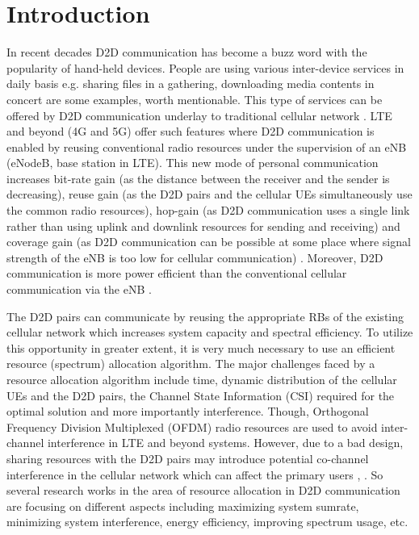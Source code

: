 \documentclass[times]{dacauth}
\begin{document}
\maketitle



\vspace{-6pt}

\section{Introduction}\label{section:Introduction}
\vspace {-0.1cm}
\noindent
In recent decades D2D communication has become a buzz word with the popularity of hand-held devices. People are using various inter-device services in daily basis e.g. sharing files in a gathering, downloading media contents in concert are some examples, worth mentionable. This type of services can be offered by D2D communication underlay to traditional cellular network \cite{doppler2009device}. LTE and beyond (4G and 5G) offer such features where D2D communication is enabled by reusing conventional radio resources under the supervision of an eNB (eNodeB, base station in LTE). This new mode of personal communication increases bit-rate gain (as the distance between the receiver and the sender is decreasing), reuse gain (as the D2D pairs and the cellular UEs simultaneously use the common radio resources), hop-gain (as D2D communication uses a single link rather than using uplink and downlink resources for sending and receiving) and coverage gain (as D2D communication can be possible at some place where signal strength of the eNB is too low for cellular communication) \cite{fodor}. Moreover, D2D communication is more power efficient than the conventional cellular communication via the eNB \cite{stefania}.
 
\smallskip
\noindent 
The D2D pairs can communicate by reusing the appropriate RBs of the existing cellular network which increases system capacity and spectral efficiency. To utilize this opportunity in greater extent, it is very much necessary to use an efficient resource (spectrum) allocation algorithm. The major challenges faced by a resource allocation algorithm include time, dynamic distribution of the cellular UEs and the D2D pairs, the Channel State Information (CSI) required for the optimal solution and more importantly interference. Though, Orthogonal Frequency Division Multiplexed (OFDM) radio resources are used to avoid inter-channel interference in LTE and beyond systems. However, due to a bad design, sharing resources with the D2D pairs may introduce potential co-channel interference in the cellular network which can affect the primary users  \cite{asadi2014survey}, \cite{min}. So several research works in the area of resource allocation in D2D communication are focusing on different aspects including maximizing system sumrate, minimizing system interference, energy efficiency, improving spectrum usage, etc.
\end{document}
